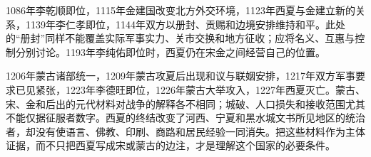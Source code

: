 1086年李乾顺即位，1115年金建国改变北方外交环境，1123年西夏与金建立新的关系，1139年李仁孝即位，1144年双方以册封、贡赐和边境安排维持和平。此处的“册封”同样不能覆盖实际军事实力、关市交换和地方征收；应将名义、互惠与控制分别讨论。1193年李纯佑即位时，西夏仍在宋金之间经营自己的位置。

1206年蒙古诸部统一，1209年蒙古攻夏后出现和议与联姻安排，1217年双方军事要求已见紧张，1223年李德旺即位，1226年蒙古大举攻入，1227年西夏灭亡。蒙古、宋、金和后出的元代材料对战争的解释各不相同；城破、人口损失和接收范围尤其不能仅据征服者数字。西夏的终结改变了河西、宁夏和黑水城文书所见地区的统治者，却没有使语言、佛教、印刷、商路和居民经验一同消失。把这些材料作为主体证据，而不只把西夏写成宋或蒙古的边注，才是理解这个国家的必要条件。

